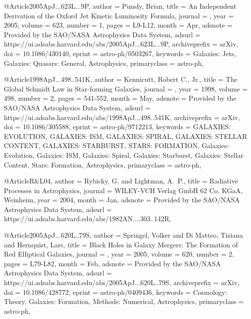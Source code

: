 \documentclass[longauth]{aa}
\begin{document}
{{{{@Article{2005ApJ...623L...9P,
  author        = {{Punsly}, Brian},
  title         = {An Independent Derivation of the Oxford Jet Kinetic Luminosity Formula},
  journal       = {\apj},
  year          = {2005},
  volume        = {623},
  number        = {1},
  pages         = {L9-L12},
  month         = {Apr},
  adsnote       = {Provided by the SAO/NASA Astrophysics Data System},
  adsurl        = {https://ui.adsabs.harvard.edu/abs/2005ApJ...623L...9P},
  archiveprefix = {arXiv},
  doi           = {10.1086/430140},
  eprint        = {astro-ph/0503267},
  keywords      = {Galaxies: Jets, Galaxies: Quasars: General, Astrophysics},
  primaryclass  = {astro-ph},
}

@Article{1998ApJ...498..541K,
  author        = {{Kennicutt}, Robert C., Jr.},
  title         = {The Global Schmidt Law in Star-forming Galaxies},
  journal       = {\apj},
  year          = {1998},
  volume        = {498},
  number        = {2},
  pages         = {541-552},
  month         = {May},
  adsnote       = {Provided by the SAO/NASA Astrophysics Data System},
  adsurl        = {https://ui.adsabs.harvard.edu/abs/1998ApJ...498..541K},
  archiveprefix = {arXiv},
  doi           = {10.1086/305588},
  eprint        = {astro-ph/9712213},
  keywords      = {GALAXIES: EVOLUTION, GALAXIES: ISM, GALAXIES: SPIRAL, GALAXIES: STELLAR CONTENT, GALAXIES: STARBURST, STARS: FORMATION, Galaxies: Evolution, Galaxies: ISM, Galaxies: Spiral, Galaxies: Starburst, Galaxies: Stellar Content, Stars: Formation, Astrophysics},
  primaryclass  = {astro-ph},
}

@Article{R&L04,
  author  = {{Rybicky}, G. and {Lightman}, A.~P.},
  title   = {Radiative Processes in Astrophysics},
  journal = {WILEY-VCH Verlag GmbH 62 Co. KGaA, Weinheim},
  year    = {2004},
  month   = {Jan},
  adsnote = {Provided by the SAO/NASA Astrophysics Data System},
  adsurl  = {https://ui.adsabs.harvard.edu/abs/1982AN....303..142R},
}

@Article{2005ApJ...620L..79S,
  author        = {{Springel}, Volker and {Di Matteo}, Tiziana and {Hernquist}, Lars},
  title         = {Black Holes in Galaxy Mergers: The Formation of Red Elliptical Galaxies},
  journal       = {\apjl},
  year          = {2005},
  volume        = {620},
  number        = {2},
  pages         = {L79-L82},
  month         = {Feb},
  adsnote       = {Provided by the SAO/NASA Astrophysics Data System},
  adsurl        = {https://ui.adsabs.harvard.edu/abs/2005ApJ...620L..79S},
  archiveprefix = {arXiv},
  doi           = {10.1086/428772},
  eprint        = {astro-ph/0409436},
  keywords      = {Cosmology: Theory, Galaxies: Formation, Methods: Numerical, Astrophysics},
  primaryclass  = {astro-ph},
}

}}}}
\end{document}
